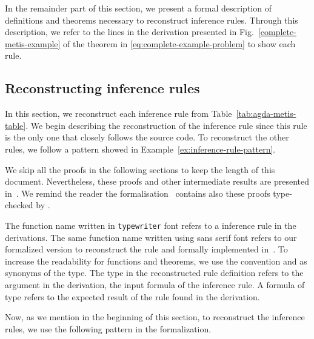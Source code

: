 \documentclass[../main.tex]{subfiles}
\begin{document}
In the remainder part of this section, we present a formal description
of definitions and theorems necessary to reconstruct \Metis inference
rules. Through this description, we refer to the lines in the \Metis
derivation presented in Fig.~\ref{complete-metis-example} of the
theorem in \eqref{eq:complete-example-problem} to show each rule.


\subsection{Reconstructing \Metis inference rules}
\label{ssec:emulating-inferences}

In this section, we reconstruct each \Metis inference rule from
Table~\ref{tab:agda-metis-table}.
We begin describing the reconstruction of the \strip inference rule
since this rule  is the only one that closely follows the \Metis
source code. To reconstruct the other rules, we follow a pattern showed
in Example~\ref{ex:inference-rule-pattern}.

We skip all the proofs in the following sections to keep the length of
this document. Nevertheless, these proofs and other intermediate
results are presented in~\cite{Prieto-Cubides2017a}. We remind the
reader the formalisation~\cite{AgdaMetis,AgdaProp} contains also these
proofs type-checked by \Agda.

\begin{notation}
  The function name written in \texttt{typewriter} font refers to a
  \Metis inference rule in the \TSTP derivations. The same function
  name written using
  \textsf{sans serif} font refers to our formalized version to
  reconstruct the rule and formally implemented in~\cite{AgdaMetis}.
  To increase the readability for functions and theorems, we use
  the convention \Source and \Target as synonyms of the \Prop
  type. The \Source type in the reconstructed rule definition refers
  to the argument in the \TSTP derivation, \ie the input formula of
  the inference rule. A formula of \Target type refers to the
  expected result of the rule found in the \TSTP derivation.
\end{notation}



Now, as we mention in the beginning of this section, to reconstruct
the \Metis inference rules, we use the following pattern in
the formalization.
\end{document}

